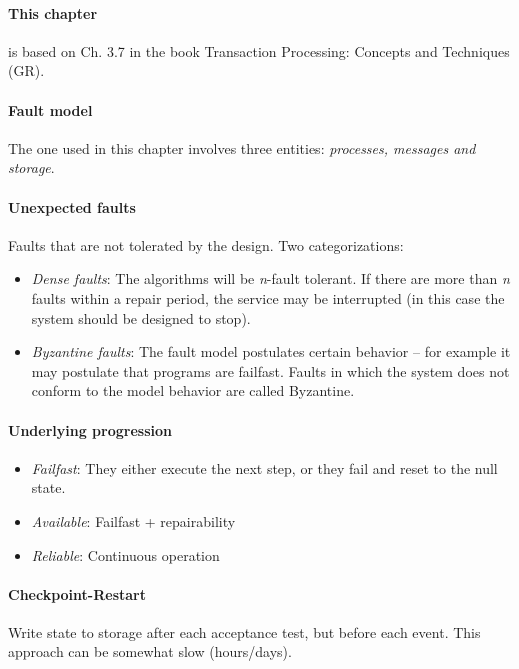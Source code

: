 
\paragraph{This chapter} is based on Ch. 3.7 in the book Transaction Processing: Concepts and Techniques (GR).

\sepline

\paragraph{Fault model} The one used in this chapter involves three entities: \textit{processes, messages and storage}.

\paragraph{Unexpected faults} Faults that are not tolerated by the design. Two categorizations:
\begin{itemize}[nolistsep,noitemsep]
  \item \textit{Dense faults}: The algorithms will be \textit{n}-fault tolerant. If there are more than \textit{n} faults within a repair period, the service may be interrupted (in this case the system should be designed to stop).
  \item \textit{Byzantine faults}: The fault model postulates certain behavior -- for example it may postulate that programs are failfast. Faults in which the system does not conform to the model behavior are called Byzantine.
\end{itemize}

\paragraph{Underlying progression}
\begin{itemize}
  \item \textit{Failfast}: They either execute the next step, or they fail and reset to the null state.
  \item \textit{Available}: Failfast + repairability
  \item \textit{Reliable}: Continuous operation
\end{itemize}

\paragraph{Checkpoint-Restart} Write state to storage after each acceptance test, but before each event. This approach can be somewhat slow (hours/days).


